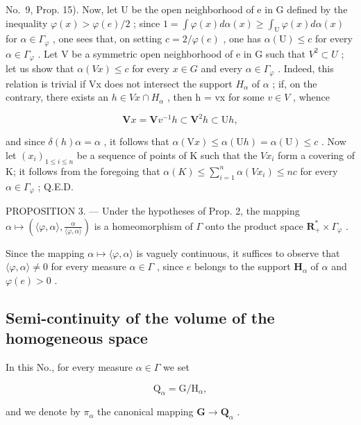No.~9, Prop. 15). Now, let U be the open neighborhood of e in G defined by the inequality \(\varphi(x) > \varphi(e)/2\) ; since \(1 = \int \varphi(x) d\alpha(x) \geqslant \int_{\mathrm{U}} \varphi(x) d\alpha(x)\) for \(\alpha \in \Gamma_{\varphi}\) , one sees that, on setting \(c = 2/\varphi(e)\) , one has \(\alpha(\mathrm{U}) \leqslant c\) for every \(\alpha \in \Gamma_{\varphi}\) . Let V be a symmetric open neighborhood of e in G such that \(V^{2} \subset U\) ; let us show that \(\alpha(Vx) \leqslant c\) for every \(x \in G\) and every \(\alpha \in \Gamma_{\varphi}\) . Indeed, this relation is trivial if Vx does not intersect the support \(H_{\alpha}\) of \(\alpha\) ; if, on the contrary, there exists an \(h \in Vx \cap H_{\alpha}\) , then h = vx for some \(v \in V\) , whence

\[
\mathbf {V} x = \mathbf {V} v ^ {- 1} h \subset \mathbf {V} ^ {2} h \subset \mathrm{U} h,
\]

and since \(\delta(h)\alpha = \alpha\) , it follows that \(\alpha(\mathrm{V}x) \leqslant \alpha(\mathrm{U}h) = \alpha(\mathrm{U}) \leqslant c\) . Now let \((x_i)_{1 \leqslant i \leqslant n}\) be a sequence of points of K such that the \(Vx_i\) form a covering of K; it follows from the foregoing that \(\alpha(K) \leqslant \sum_{i=1}^{n} \alpha(Vx_i) \leqslant nc\) for every \(\alpha \in \Gamma_\varphi\) ; Q.E.D.

PROPOSITION 3. --- Under the hypotheses of Prop. 2, the mapping \(\alpha \mapsto \left( \langle \varphi, \alpha \rangle, \frac{\alpha}{\langle \varphi, \alpha \rangle} \right)\) is a homeomorphism of \(\Gamma\) onto the product space \(\mathbf{R}_{+}^{*} \times \Gamma_{\varphi}\) .

Since the mapping \(\alpha \mapsto \langle \varphi, \alpha \rangle\) is vaguely continuous, it suffices to observe that \(\langle \varphi, \alpha \rangle \neq 0\) for every measure \(\alpha \in \Gamma\) , since \(e\) belongs to the support \(\mathbf{H}_{\alpha}\) of \(\alpha\) and \(\varphi(e) > 0\) .

\subsection{Semi-continuity of the volume of the homogeneous space}

In this No., for every measure \(\alpha \in \Gamma\) we set

\[
\mathrm{Q} _ {\alpha} = \mathrm{G} / \mathrm{H} _ {\alpha},\tag{1}
\]

and we denote by \(\pi_{\alpha}\) the canonical mapping \(\mathbf{G} \to \mathbf{Q}_{\alpha}\) .

